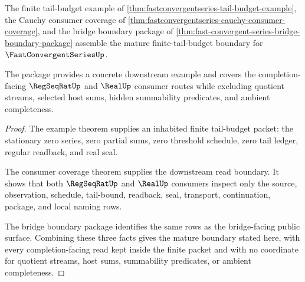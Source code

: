 \begin{theorem}
\label{thm:fastconvergentseries-mature-boundary-package}
The finite tail-budget example of \autoref{thm:fastconvergentseries-tail-budget-example}, the Cauchy consumer coverage of \autoref{thm:fastconvergentseries-cauchy-consumer-coverage}, and the bridge boundary package of \autoref{thm:fast-convergent-series-bridge-boundary-package} assemble the mature finite-tail-budget boundary for $\FastConvergentSeriesUp$.

The package provides a concrete downstream example and covers the completion-facing $\RegSeqRatUp$ and $\RealUp$ consumer routes while excluding quotient streams, selected host sums, hidden summability predicates, and ambient completeness.
\end{theorem}
\begin{proof}
The example theorem supplies an inhabited finite tail-budget packet: the stationary zero series, zero partial sums, zero threshold schedule, zero tail ledger, regular readback, and real seal.

The consumer coverage theorem supplies the downstream read boundary. It shows that both $\RegSeqRatUp$ and $\RealUp$ consumers inspect only the source, observation, schedule, tail-bound, readback, seal, transport, continuation, package, and local naming rows.

The bridge boundary package identifies the same rows as the bridge-facing public surface. Combining these three facts gives the mature boundary stated here, with every completion-facing read kept inside the finite packet and with no coordinate for quotient streams, host sums, summability predicates, or ambient completeness.
\end{proof}


